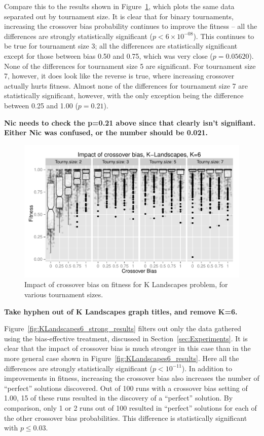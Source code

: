 \documentclass{sig-alternate}
\begin{document}
Compare this to the results shown in Figure~\ref{fig:KLandscapes6_XO_bias_impact_facets}, which plots the same data
separated out by tournament size. It is clear that for binary tournaments, increasing the crossover bias probability
continues to improve the fitness -- all the differences are strongly statistically significant ($p<6\times 10^{-08}$). This
continues to be true for tournament size 3; all the differences are statistically significant except for those between
bias 0.50 and 0.75, which was very close ($p=0.05620$). None of the differences for tournament size 5 are
significant. For tournament size 7, however, it does look like the reverse is true, where
increasing crossover actually hurts fitness. Almost none of the differences for tournament size 7 are statistically
significant, however, with the only exception being the difference between 0.25 and 1.00 ($p=0.21$).

\textbf{Nic needs to check the p=0.21 above since that clearly isn't signifiant. Either Nic was confused, or the number should be 0.021.}

\begin{figure}
\centering
\includegraphics[width=0.45 \textwidth]{Plots/KLandscapes6_XO_bias_impact_facets.pdf}
\caption{Impact of crossover bias on fitness for K Landscapes problem, for various tournament sizes.}
\label{fig:KLandscapes6_XO_bias_impact_facets}
\end{figure}

\textbf{Take hyphen out of K Landscapes graph titles, and remove K=6.}

Figure~\ref{fig:KLandscapes6_strong_results} filters out only the data gathered using the bias-effective treatment,
discussed in Section~\ref{sec:Experiments}. It is clear that the impact of crossover bias is much stronger in this case
than in the more general case shown in Figure~\ref{fig:KLandscapes6_results}. Here all the differences are strongly
statistically significant ($p < 10^{-11}$). In addition to improvements in fitness, increasing the crossover bias also
increases the number of ``perfect'' solutions discovered. Out of 100 runs with a crossover bias setting of 1.00, 15 of
these runs resulted in the discovery of a ``perfect'' solution. By comparison, only 1 or 2 runs out of 100 resulted in
``perfect'' solutions for each of the other crossover bias probabilities. This difference is statistically significant with
$p \leq 0.03$.
\end{document}
